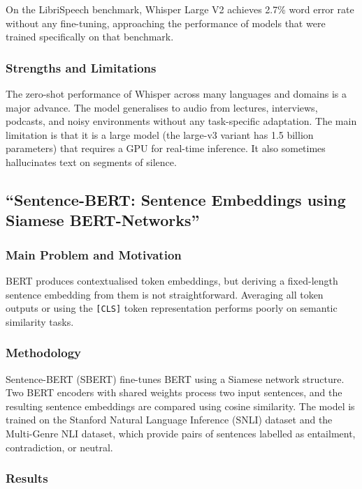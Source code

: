 \documentclass[12pt, a4paper]{report}
\begin{document}
On the LibriSpeech benchmark, Whisper Large V2 achieves 2.7\% word error
rate without any fine-tuning, approaching the performance of models that
were trained specifically on that benchmark.

\subsubsection{Strengths and Limitations}

The zero-shot performance of Whisper across many languages and domains
is a major advance. The model generalises to audio from lectures, interviews,
podcasts, and noisy environments without any task-specific adaptation.
The main limitation is that it is a large model (the large-v3 variant has
1.5 billion parameters) that requires a GPU for real-time inference. It
also sometimes hallucinates text on segments of silence.

\subsection{``Sentence-BERT: Sentence Embeddings using Siamese BERT-Networks''
\cite{reimers2019sentencebert}}

\subsubsection{Main Problem and Motivation}

BERT produces contextualised token embeddings, but deriving a fixed-length
sentence embedding from them is not straightforward. Averaging all token
outputs or using the \texttt{[CLS]} token representation performs poorly
on semantic similarity tasks.

\subsubsection{Methodology}

Sentence-BERT (SBERT) fine-tunes BERT using a Siamese network structure.
Two BERT encoders with shared weights process two input sentences, and the
resulting sentence embeddings are compared using cosine similarity. The
model is trained on the Stanford Natural Language Inference (SNLI) dataset
and the Multi-Genre NLI dataset, which provide pairs of sentences labelled
as entailment, contradiction, or neutral.

\subsubsection{Results}
\end{document}
